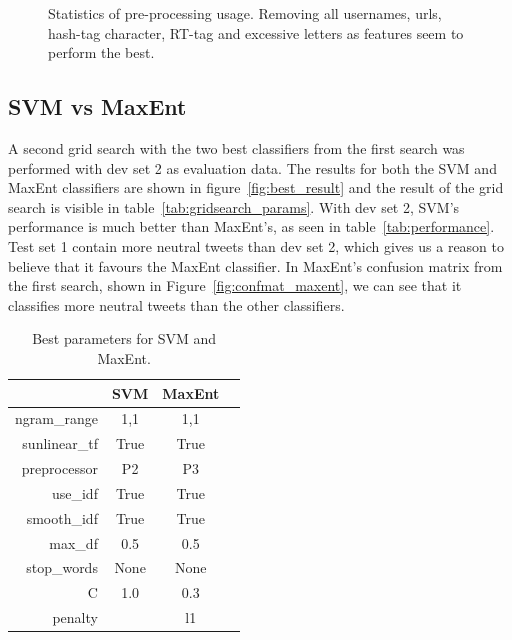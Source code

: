 \begin{figure}[!htb]
	\centering
	\caption[Statistics of pre-processing usage.]{Statistics of pre-processing usage. Removing all usernames, urls, hash-tag character, RT-tag and excessive letters as features seem to perform the best.}
	\label{fig:preprocess_usage}
\end{figure}

\clearpage
\subsection{SVM vs MaxEnt}
A second grid search with the two best classifiers from the first search was performed with dev set 2 as evaluation data. The results for both the SVM and MaxEnt classifiers are shown in figure~\ref{fig:best_result} and the result of the grid search is visible in table~\ref{tab:gridsearch_params}. With dev set 2, SVM's performance is much better than MaxEnt's, as seen in table~\ref{tab:performance}. Test set 1 contain more neutral tweets than dev set 2, which gives us a reason to believe that it favours the MaxEnt classifier. In MaxEnt's confusion matrix from the first search, shown in Figure~\ref{fig:confmat_maxent}, we can see that it classifies more neutral tweets than the other classifiers.

\begin{table}[!htb]
\centering
\begin{tabular}{|r||c|c|c|} 
\cline{2-3}
\multicolumn{1}{c|}{ } & \textbf{SVM} & \textbf{MaxEnt} \\ \hline
ngram\_range & 1,1 & 1,1 \\ \hline
sunlinear\_tf  & True & True \\ \hline
preprocessor & P2 & P3 \\ \hline
use\_idf & True & True \\ \hline
smooth\_idf & True & True \\ \hline
max\_df & 0.5 & 0.5 \\ \hline
stop\_words & None & None \\ \hline
C & 1.0 & 0.3 \\ \hline
penalty &  & l1 \\ \hline

\end{tabular}
\caption{Best parameters for SVM and MaxEnt.}
\label{tab:svm_maxent_best_params}
\end{table}


